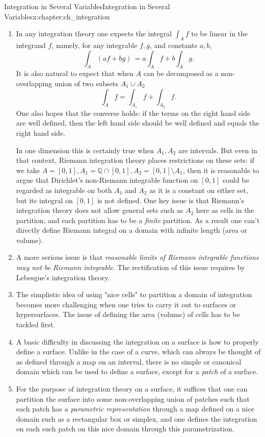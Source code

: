 \documentclass[oneside,10pt,]{book}
\begin{document}
\begin{chapterptx}{Integration in Several Variables}{}{Integration in Several Variables}{}{}{x:chapter:ch_integration}
\begin{introduction}{}
\begin{enumerate}
\item{}In any integration theory one expects the integral \(\int_{A}f\) to be linear in the integrand \(f\), namely, for any integrable \(f, g\), and constants \(a, b\),%
\begin{equation*}
\int_{A} \left( a f+ b g\right)\, = a \int_{A}f  + b \int_{A}g.
\end{equation*}
It is also natural to expect that when \(A\) can be decomposed as a non-overlapping union of two subsets \(A_{1}\cup A_{2}\)%
\begin{equation*}
\int_{A}f =\int_{A_{1}}f + \int_{A_{2}}f\text{.}
\end{equation*}
One also hopes that the converse holds: if the terms on the right hand side are well defined, then the left hand side should be well defined and equals the right hand side.%
\par
In one dimension this is certainly true when \(A_{1}, A_{2}\) are intervals. But even in that context, Riemann integration theory places restrictions on these sets: if we take \(A=[0,1], A_{1}={\mathbb Q}\cap [0, 1], A_{2}=[0,1]\setminus A_{1}\), then it is reasonable to argue that Dirichlet's non-Riemann integrable function on \([0,1]\) could be regarded as integrable on both \(A_{1}\) and \(A_{2}\) as it is a constant on either set, but its integral on \([0, 1]\) is not defined. One key issue is that Riemann's integration theory does not allow general sets such as \(A_{2}\) here as cells in the partition, and each partition has to be a \emph{finite} partition. As a result one can't directly define Riemann integral on a domain with infinite length (area or volume).%
\item{}A more serious issue is that \emph{reasonable limits of Riemann integrable functions may not be Riemann integrable}. The rectification of this issue requires by Lebesgue's integration theory.%
\item{}The simplistic idea of using "nice cells" to partition a domain of integration becomes more challenging when one tries to carry it out to surfaces or hypersurfaces. The issue of defining the area (volume) of cells has to be tackled first.%
\item{}A basic difficulty in discussing the integration on a surface is how to properly define a surface. Unlike in the case of a curve, which can always be thought of as defined through a map on an interval, there is no simple or canonical domain  which can be used to define a surface, except for a \emph{patch} of a surface.%
\item{}For the purpose of integration theory on a surface, it suffices that one can partition the surface into some non-overlapping union of patches such that each patch has a \emph{parametric representation} through a map defined on a nice domain such as a rectangular box or simplex, and one defines the integration on each such patch on this nice domain through this parametrization.%

\end{enumerate}
\end{introduction}
\end{chapterptx}
\end{document}
